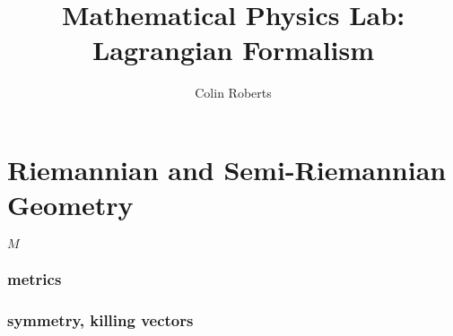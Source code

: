 \documentclass[12pt]{article}
\title{Mathematical Physics Lab: Lagrangian Formalism}
\author{Colin Roberts}
\theoremstyle{definition}
\begin{document}
\maketitle

\part{Riemannian and Semi-Riemannian Geometry}
$M$

\section{metrics}

\section{symmetry, killing vectors}
\end{document}
